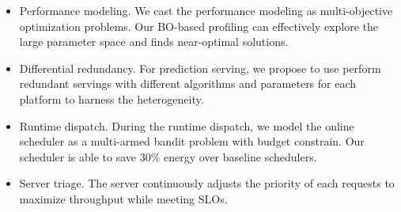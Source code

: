 \begin{itemize}[leftmargin=*, topsep=0pt, itemsep=0pt]

\item Performance modeling. We cast the performance modeling as multi-objective
  optimization problems. Our BO-based profiling can effectively explore the
  large parameter space and finds near-optimal solutions.

\item Differential redundancy. For prediction serving, we propose to use perform
  redundant servings with different algorithms and parameters for each platform
  to harness the heterogeneity.

\item Runtime dispatch. During the runtime dispatch, we model the online
  scheduler as a multi-armed bandit problem with budget constrain. Our scheduler
  is able to save 30\% energy over baseline schedulers.

\item Server triage. The server continuously adjusts the priority of each
  requests to maximize throughput while meeting SLOs.

\end{itemize}



